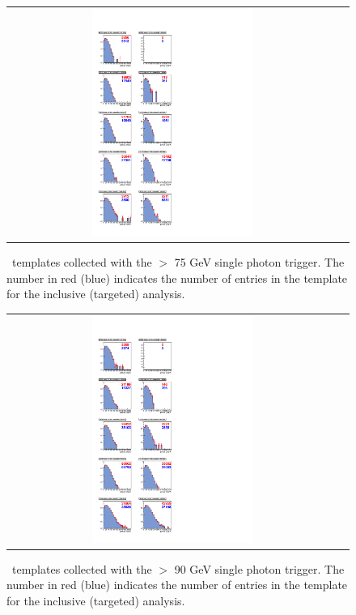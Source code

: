 \clearpage

\begin{figure}[!h]
\begin{center}
\begin{tabular}{cc}
\includegraphics[width=0.5\textwidth]{plots/template_targeted_3.pdf}
\end{tabular}
\caption{
\MET\ templates collected with the \pt $>$ 75 GeV single photon trigger.
The number in red (blue) indicates the number of entries in the template for the inclusive (targeted) analysis.
}
\end{center}
\end{figure}

\clearpage

\begin{figure}[!h]
\begin{center}
\begin{tabular}{cc}
\includegraphics[width=0.5\textwidth]{plots/template_targeted_4.pdf}
\end{tabular}
\caption{
\MET\ templates collected with the \pt $>$ 90 GeV single photon trigger.
The number in red (blue) indicates the number of entries in the template for the inclusive (targeted) analysis.
}
\end{center}
\end{figure}
